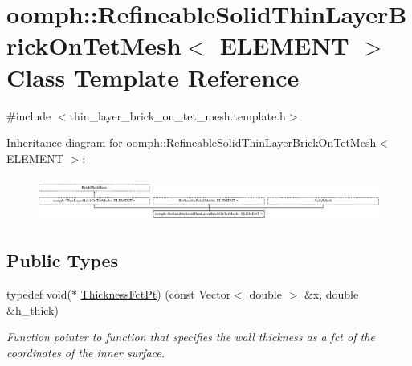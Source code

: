\hypertarget{classoomph_1_1RefineableSolidThinLayerBrickOnTetMesh}{}\section{oomph\+:\+:Refineable\+Solid\+Thin\+Layer\+Brick\+On\+Tet\+Mesh$<$ E\+L\+E\+M\+E\+NT $>$ Class Template Reference}
\label{classoomph_1_1RefineableSolidThinLayerBrickOnTetMesh}


{\ttfamily \#include $<$thin\+\_\+layer\+\_\+brick\+\_\+on\+\_\+tet\+\_\+mesh.\+template.\+h$>$}

Inheritance diagram for oomph\+:\+:Refineable\+Solid\+Thin\+Layer\+Brick\+On\+Tet\+Mesh$<$ E\+L\+E\+M\+E\+NT $>$\+:\begin{figure}[H]
\begin{center}
\leavevmode
\includegraphics[height=1.458333cm]{classoomph_1_1RefineableSolidThinLayerBrickOnTetMesh}
\end{center}
\end{figure}
\subsection*{Public Types}
\begin{DoxyCompactItemize}
\item 
typedef void($\ast$ \hyperlink{classoomph_1_1RefineableSolidThinLayerBrickOnTetMesh_a45af8cb1926cec40d597eb18b75b96da}{Thickness\+Fct\+Pt}) (const Vector$<$ double $>$ \&x, double \&h\+\_\+thick)
\begin{DoxyCompactList}\small\item\em Function pointer to function that specifies the wall thickness as a fct of the coordinates of the inner surface. \end{DoxyCompactList}\end{DoxyCompactItemize}
